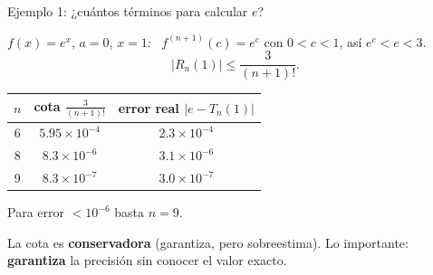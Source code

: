 \documentclass[10pt,aspectratio=169]{beamer}
\begin{document}
\begin{frame}{Ejemplo 1: ¿cuántos términos para calcular $e$?}
  \begin{ejemplo}
    $f(x)=e^x$, $a=0$, $x=1$: \ $f^{(n+1)}(c)=e^c$ con $0<c<1$, así $e^c<e<3$.
    \[ |R_n(1)|\le\frac{3}{(n+1)!}. \]
    \begin{center}
      \renewcommand{\arraystretch}{1.3}
      \begin{tabular}{c|c|c}
        $n$ & cota $\frac{3}{(n+1)!}$ & error real $|e-T_n(1)|$\\ \hline
        6 & $5.95\times10^{-4}$ & $2.3\times10^{-4}$\\
        8 & $8.3\times10^{-6}$ & $3.1\times10^{-6}$\\
        9 & $8.3\times10^{-7}$ & $3.0\times10^{-7}$
      \end{tabular}
    \end{center}
    Para error $<10^{-6}$ basta $n=9$.
  \end{ejemplo}
  \begin{observacion}
    La cota es \textbf{conservadora} (garantiza, pero sobreestima). Lo importante: \textbf{garantiza} la precisión sin conocer el valor exacto.
  \end{observacion}
\end{frame}
\end{document}
